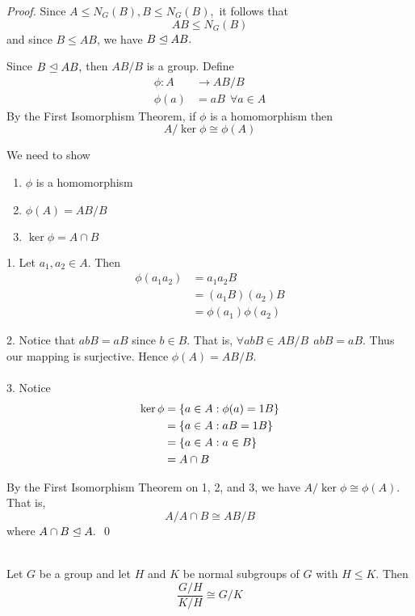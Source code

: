 \begin{proof}
    Since $A \leq N_G(B), B \leq N_G(B),$ it follows that 
    $$AB \leq N_G(B)$$
    and since $B \leq AB$, we have $B \trianglelefteq AB.$

    Since $B \trianglelefteq AB,$ then $AB/B$ is a group. Define 
    \begin{align*}
        \phi: A &\to AB/B \\
        \phi(a) &= aB ~~\forall a \in A
    \end{align*}
    By the First Isomorphism Theorem, if $\phi$ is a homomorphism then 
    $$A/\ker\phi \cong \phi(A)$$

    We need to show 
    \begin{enumerate}
        \item $\phi$ is a homomorphism
        \item $\phi(A) = AB/B$
        \item $\ker\phi = A\cap B$
    \end{enumerate}

    1. Let $a_1, a_2 \in A$. Then 
    \begin{align*}
        \phi(a_1a_2) &= a_1a_2B \\
        &=(a_1B)(a_2)B \\
        &=\phi(a_1)\phi(a_2)
    \end{align*}

    2. Notice that $abB = aB$ since $b\in B$. That is, $\forall abB \in AB/B ~~abB = aB.$ Thus our mapping is surjective. Hence $\phi(A) = AB/B.$
    \\ \\
    3. Notice 
    \begin{align*}
        \ker\phi &= \left\{a \in A : \phi(a) = 1B\right\} \\
        &= \left\{a \in A : aB = 1B\right\} \\
        &= \left\{a \in A : a \in B\right\} \\
        &= A \cap B
    \end{align*}

    By the First Isomorphism Theorem on 1, 2, and 3, we have $A/\ker\phi \cong \phi(A)$. That is,
    $$A/A\cap B \cong AB/B$$
    where $A\cap B \trianglelefteq A.$
    \qed
\end{proof}

\begin{theorem} \leavevmode \\
    \label{thm19}
    Let $G$ be a group and let $H$ and $K$ be normal subgroups of $G$ with $H \leq K.$ Then 
    $$\frac{G/H}{K/H} \cong G/K$$
\end{theorem}

